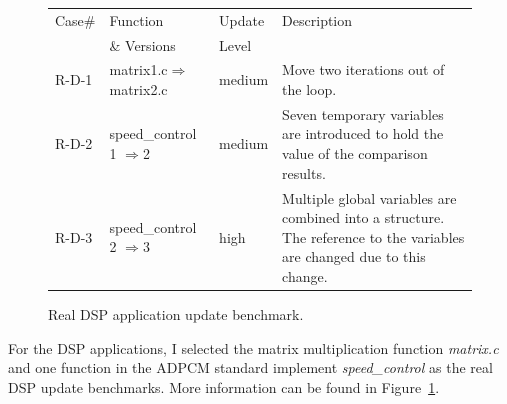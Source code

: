 \begin{figure}[htdp]
\begin{small}
\begin{center}
\begin{tabular}{||p{0.5in}|p{1.5in}|p{0.6in}|p{3.5in}||}
\hline
Case\#  &  Function & Update & Description \\
 & \& Versions &Level&\\
\hline\hline
R-D-1 &  matrix1.c$\Rightarrow$matrix2.c& medium & Move two iterations out of the loop.\\
\hline
R-D-2 &  speed\_control 1 $\Rightarrow$2 & medium &Seven temporary variables are introduced to hold the value of the comparison results.\\
\hline
R-D-3 & speed\_control 2 $\Rightarrow$3 &high &  Multiple global variables are combined into a structure. The reference to the variables are changed due to this change.\\
\hline
\end{tabular}
\end{center}
\caption{Real DSP application update benchmark. }
\label{dsp-bench}
\end{small}
\end{figure}
For the DSP applications, I selected the matrix multiplication function {\it matrix.c} and one function in the ADPCM standard implement {\it speed\_control} as the real DSP update benchmarks. More information can be found in Figure~\ref{dsp-bench}. 



